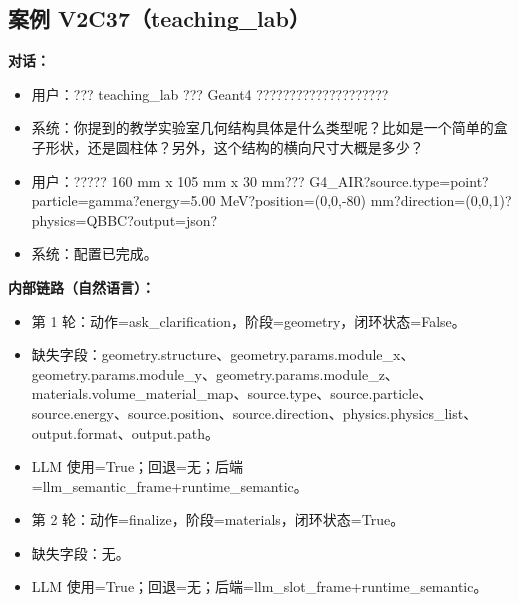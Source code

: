 \documentclass[11pt]{ctexart}
\begin{document}
\subsection{案例 V2C37（teaching\_lab）}
\textbf{对话：}
\begin{itemize}
\item 用户：??? teaching\_lab ??? Geant4 ????????????????????
\item 系统：你提到的教学实验室几何结构具体是什么类型呢？比如是一个简单的盒子形状，还是圆柱体？另外，这个结构的横向尺寸大概是多少？
\item 用户：????? 160 mm x 105 mm x 30 mm??? G4\_AIR?source.type=point?particle=gamma?energy=5.00 MeV?position=(0,0,-80) mm?direction=(0,0,1)?physics=QBBC?output=json?
\item 系统：配置已完成。
\end{itemize}
\textbf{内部链路（自然语言）：}
\begin{itemize}
\item 第 1 轮：动作=ask\_clarification，阶段=geometry，闭环状态=False。
\item 缺失字段：geometry.structure、geometry.params.module\_x、geometry.params.module\_y、geometry.params.module\_z、materials.volume\_material\_map、source.type、source.particle、source.energy、source.position、source.direction、physics.physics\_list、output.format、output.path。
\item LLM 使用=True；回退=无；后端=llm\_semantic\_frame+runtime\_semantic。
\item 第 2 轮：动作=finalize，阶段=materials，闭环状态=True。
\item 缺失字段：无。
\item LLM 使用=True；回退=无；后端=llm\_slot\_frame+runtime\_semantic。
\end{itemize}
\end{document}
